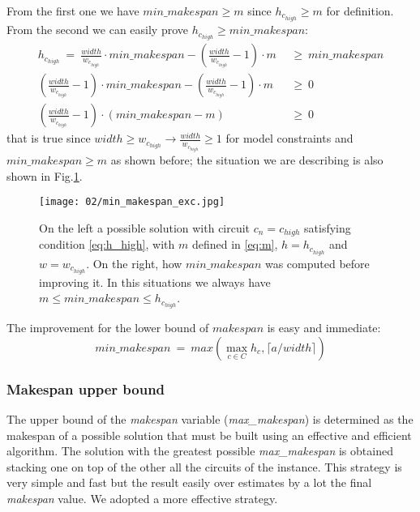         From the first one we have $min\_makespan \geq m$ since $h_{c_{high}} \geq m$ for definition.
        From the second we can easily prove $h_{c_{high}} \geq min\_makespan$:
        \begin{align*}
            h_{c_{high}}\ =\ \frac{width}{w_{c_{high}}} \cdot min\_makespan - \left( \frac{width}{w_{c_{high}}} - 1\right) \cdot m\ &\ \geq\ min\_makespan       \\
            \left( \frac{width}{w_{c_{high}}} - 1\right) \cdot min\_makespan - \left( \frac{width}{w_{c_{high}}} - 1\right) \cdot m\ &\ \geq\ 0 \\
            \left( \frac{width}{w_{c_{high}}} - 1\right) \cdot \left(min\_makespan - m\right) \ &\ \geq\ 0
        \end{align*}
        that is true since $width \geq w_{c_{high}} \rightarrow \frac{width}{w_{c_{high}}} \geq 1$ for model constraints and $min\_makespan \geq m$ as shown before;
        the situation we are describing is also shown in Fig.\ref{fig:min_makespan}. 

        \begin{figure}[H]
            \centering
            \texttt{[image: 02/min\_makespan\_exc.jpg]}
            \caption{
                On the left a possible solution with circuit $c_n=c_{high}$ satisfying condition \ref{eq:h_high}, 
                with $m$ defined in \ref{eq:m}, $h = h_{c_{high}}$ and $w = w_{c_{high}}$. On the right, how $min\_makespan$ 
                was computed before improving it. In this situations we always have $m \leq min\_makespan \leq h_{c_{high}}$.
            }
            \label{fig:min_makespan}
        \end{figure}
        
        The improvement for the lower bound of $makespan$ is easy and immediate:
        \begin{equation*}
            min\_makespan\ =\ max\left(\max_{c \in C} h_c, \lceil a / width \rceil\right)
        \end{equation*}

    \subsubsection{Makespan upper bound}
        The upper bound of the \textit{makespan} variable (\textit{max\_makespan}) is determined as the makespan of a possible 
        solution that must be built using an effective and efficient algorithm. 
        The solution with the greatest possible \textit{max\_makespan} is obtained stacking one on top of the other all the circuits
        of the instance. This strategy is very simple and fast but the result easily over estimates by a lot the final 
        \textit{makespan} value. We adopted a more effective strategy. \\
        
